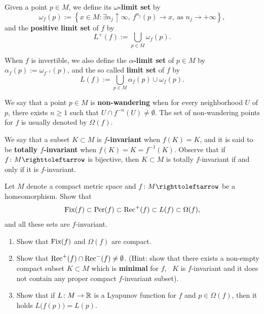 Given a point $p\in M$, we define its \textbf{$\omega$-limit set} by
\begin{displaymath}
  \omega_{f}(p):=\left\{x\in M : \exists n_{j}\uparrow\infty,\ f^{n_{j}}(p)\to x,\ \text{as } n_{j}\to+\infty\right\},
\end{displaymath}
and the \textbf{positive limit set} of $f$ by
\begin{displaymath}
  L^+(f):=\bigcup_{p\in M} \omega_{f}(p).
\end{displaymath}

When $f$ is invertible, we also define the \textbf{$\alpha$-limit set} of $p\in M$ by $\alpha_{f}(p):=\omega_{f^{-1}}(p)$, and the so called \textbf{limit set} of $f$ by
\begin{displaymath}
  L(f):=\bigcup_{p\in M} \alpha_{f}(p)\cup \omega_{f}(p).
\end{displaymath}

We say that a point $p\in M$ is \textbf{non-wandering} when for every neighborhood $U$ of $p$, there exists $n\geq 1$ such that $U\cap f^{-n}(U)\neq\emptyset$. The set of non-wandering points for $f$ is usually denoted by $\Omega(f)$.

We say that a subset $K\subset M$ is \textbf{$f$-invariant} when $f(K)=K$, and it is said to be \textbf{totally $f$-invariant} when $f(K)=K=f^{-1}(K)$. Observe that if $f\colon M\carr$ is bijective, then $K\subset M$ is totally $f$-invariant if and only if it is $f$-invariant.

\begin{exercise}
  \label{ex:inclusions-fix-per-rec-limit-sets-non-wandering}
  Let $M$ denote a compact metric space and $f\colon M\carr$ be a homeomorphism. Show that
  \begin{displaymath}
    \operatorname{Fix}(f)\subset\operatorname{Per}(f)\subset\mathrm{Rec}^+(f)\subset L(f)\subset\Omega(f),
  \end{displaymath}
  and all these sets are $f$-invariant.

  \begin{enumerate}
    \item Show that $\operatorname{Fix}(f)$ and $\Omega(f)$ are compact.
    \item Show that $\mathrm{Rec}^+(f)\cap\mathrm{Rec}^-(f)\neq\emptyset$. (Hint: show that there exists a non-empty compact subset $K\subset M$ which is \textbf{minimal} for $f$, \ie~$K$ is $f$-invariant and it does not contain any proper compact $f$-invariant subset).
    \item Show that if $L\colon M\to\mathbb{R}$ is a Lyapunov function for $f$ and $p\in\Omega(f)$, then it holds $L\big(f(p)\big)=L(p)$.
  \end{enumerate}
\end{exercise}

